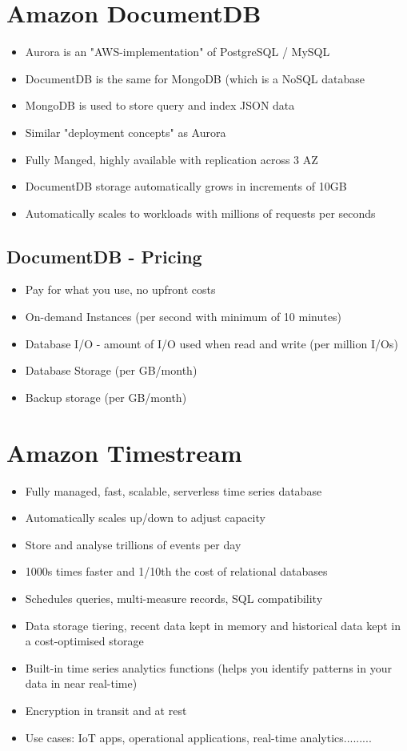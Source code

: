 \section{Amazon DocumentDB}
\begin{itemize}
    \item Aurora is an "AWS-implementation" of PostgreSQL / MySQL
    \item DocumentDB is the same for MongoDB (which is a NoSQL database
    \item MongoDB is used to store query and index JSON data
    \item Similar "deployment concepts" as Aurora
    \item Fully Manged, highly available with replication across 3 AZ
    \item DocumentDB storage automatically grows in increments of 10GB
    \item Automatically scales to workloads with millions of requests per seconds
\end{itemize}

\subsection{DocumentDB - Pricing}
\begin{itemize}
    \item Pay for what you use, no upfront costs
    \item On-demand Instances (per second with minimum of 10 minutes)
    \item Database I/O - amount of I/O used when read and write (per million I/Os)
    \item Database Storage (per GB/month)
    \item Backup storage (per GB/month)
\end{itemize}


\section{Amazon Timestream}

\begin{itemize}
    \item Fully managed, fast, scalable, serverless time series database
    \item Automatically scales up/down to adjust capacity
    \item Store and analyse trillions of events per day
    \item 1000s times faster and 1/10th the cost of relational databases
    \item Schedules queries, multi-measure records, SQL compatibility
    \item Data storage tiering, recent data kept in memory and historical data kept in a cost-optimised storage
    \item Built-in time series analytics functions (helps you identify patterns in your data in near real-time)
    \item Encryption in transit and at rest
    \item Use cases: IoT apps, operational applications, real-time analytics.........
\end{itemize}

